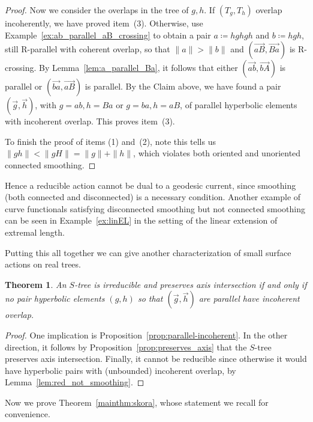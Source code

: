 \documentclass[11pt]{amsart}
\newcommand{\ora}[1]{\overrightarrow{#1}}
\numberwithin{equation}{section}
\numberwithin{figure}{section}
\newtheorem{theorem}{Theorem}[section]
\theoremstyle{definition}
\theoremstyle{plain}
\begin{document}
\begin{proof}
Now we consider the overlaps in the tree of $g,h$. If $(T_g,T_h)$
overlap
incoherently, we have proved item~(3). Otherwise, use
Example~\ref{ex:ab_parallel_aB_crossing} to obtain a pair $a \coloneqq hghgh$
and $b \coloneqq hgh$, still R-parallel with coherent overlap, so that
$\|a\|>\|b\|$ and
$(\ora{aB},\ora{Ba})$ is R-crossing. By Lemma~\ref{lem:a_parallel_Ba},
it follows that either $(\ora{ab},\ora{bA})$ is parallel or $(\ora{ba},\ora{aB})$ is parallel.
By the Claim above, we have found a pair $(\ora{g},\ora{h})$, with
$g = ab, h = Ba$ or  $g = ba, h = aB$, of parallel hyperbolic elements with
incoherent overlap. This proves item~(3). 

To finish the proof of items (1) and~(2), note
this tells us $\| gh \| < \|gH\|=\|g\| + \|h\|$, which violates both oriented and unoriented connected smoothing.
\end{proof}

Hence a reducible action cannot be dual to a geodesic current, since
smoothing (both connected and disconnected) is a necessary condition.
Another example of curve functionals satisfying disconnected smoothing
but not connected smoothing can be seen in Example~\ref{ex:linEL} in
the setting of the linear extension of extremal length.

Putting this all together we can give another characterization of small surface actions on real trees.

\begin{theorem}
An $S$-tree is irreducible and preserves axis intersection if and only
if no pair hyperbolic elements $(g,h)$ so that $(\ora{g},\ora{h})$ are
parallel have incoherent
overlap.
\label{thm:axis_incoherent_characterization}
\end{theorem}
\begin{proof}
One implication is Proposition~\ref{prop:parallel-incoherent}.
In the other direction, it follows by
Proposition~\ref{prop:preserves_axis} that the $S$-tree
preserves axis intersection. Finally, it cannot be reducible since
otherwise it would have hyperbolic pairs with (unbounded) incoherent
overlap, by Lemma~\ref{lem:red_not_smoothing}.
\end{proof}


Now we prove Theorem~\ref{mainthm:skora}, whose statement we recall
for convenience.
\end{document}
